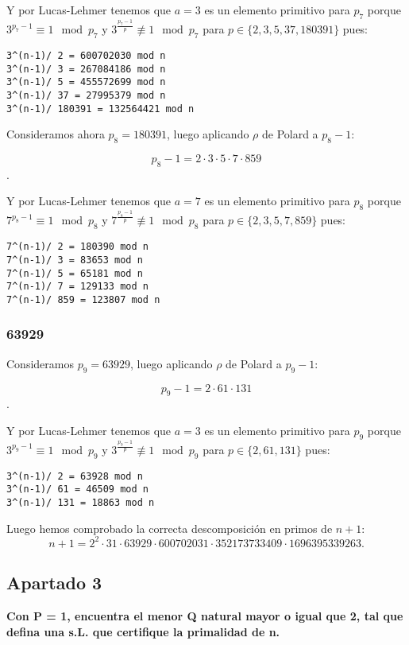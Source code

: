 \documentclass[a4paper]{article}
\begin{document}
Y por Lucas-Lehmer tenemos que $a=3$ es un elemento primitivo para $p_7$ porque $3^{p_7-1}\equiv 1\mod p_7$ y $3^{\frac{p_7-1}{p}}\not\equiv 1\mod p_7 $ para $p\in\{2, 3,5,37, 180391\}$ pues:

\begin{verbatim}
3^(n-1)/ 2 = 600702030 mod n
3^(n-1)/ 3 = 267084186 mod n
3^(n-1)/ 5 = 455572699 mod n
3^(n-1)/ 37 = 27995379 mod n
3^(n-1)/ 180391 = 132564421 mod n
\end{verbatim}

Consideramos ahora $p_8=180391$, luego aplicando $\rho$ de Polard a $p_8-1$:

$$p_8-1=2 \cdot 3\cdot 5\cdot 7\cdot 859$$.

Y por Lucas-Lehmer tenemos que $a=7$ es un elemento primitivo para $p_8$ porque $7^{p_8-1}\equiv 1\mod p_8$ y $7^{\frac{p_8-1}{p}}\not\equiv 1\mod p_8 $ para $p\in\{2, 3,5,7, 859\}$ pues:

\begin{verbatim}
7^(n-1)/ 2 = 180390 mod n
7^(n-1)/ 3 = 83653 mod n
7^(n-1)/ 5 = 65181 mod n
7^(n-1)/ 7 = 129133 mod n
7^(n-1)/ 859 = 123807 mod n
\end{verbatim}

\subsubsection{63929}

Consideramos $p_9=63929$, luego aplicando $\rho$ de Polard a $p_9-1$:

$$p_9-1=2 \cdot 61\cdot 131$$.

Y por Lucas-Lehmer tenemos que $a=3$ es un elemento primitivo para $p_9$ porque $3^{p_9-1}\equiv 1\mod p_9$ y $3^{\frac{p_9-1}{p}}\not\equiv 1\mod p_9 $ para $p\in\{2, 61,131\}$ pues:

\begin{verbatim}
3^(n-1)/ 2 = 63928 mod n
3^(n-1)/ 61 = 46509 mod n
3^(n-1)/ 131 = 18863 mod n
\end{verbatim}


Luego hemos comprobado la correcta descomposición en primos de $n+1$:
$$n+1 = 2^2\cdot 31 \cdot 63929\cdot 600702031\cdot 352173733409\cdot 1696395339263.$$


\subsection{Apartado 3}

\textbf{Con P = 1, encuentra el menor Q natural mayor o igual que 2, tal que defina una s.L. que certifique la primalidad de n.}
\end{document}
